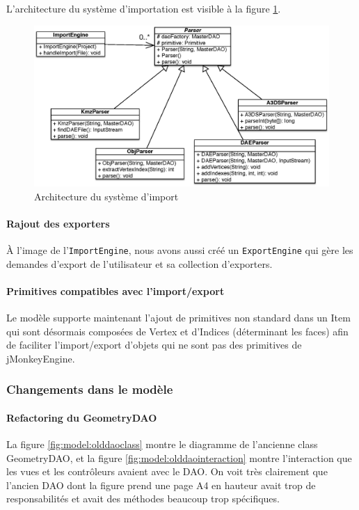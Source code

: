 		L'architecture du système d'importation est visible à la figure \ref{fig:model:parsersarchi}.

		\begin{figure}
			\center
			\includegraphics[width=\textwidth]{iteration3/fig/ParsersArchi.eps}
			\caption{\label{fig:model:parsersarchi} Architecture du système d'import}
		\end{figure}

		\paragraph{Rajout des exporters}
		À l'image de l'\texttt{ImportEngine}, nous avons aussi créé un 
		\texttt{ExportEngine} qui gère les demandes d'export de l'utilisateur et
		sa collection d'exporters.

		\paragraph{Primitives compatibles avec l'import/export}
		Le modèle supporte maintenant l'ajout de primitives non standard dans un
		Item qui sont désormais composées de Vertex et d'Indices (déterminant 
		les faces) afin de faciliter l'import/export d'objets qui ne sont pas des
		primitives de jMonkeyEngine.

	\subsubsection{Changements dans le modèle}

		\paragraph{Refactoring du GeometryDAO}
		La figure \ref{fig:model:olddaoclass} montre le diagramme de l'ancienne
		class GeometryDAO, et la figure \ref{fig:model:olddaointeraction} montre
		l'interaction que les vues et les contrôleurs avaient avec le DAO. On
		voit très clairement que l'ancien DAO dont la figure prend une page A4
		en hauteur avait trop de responsabilités et avait des méthodes beaucoup
		trop spécifiques.\\

